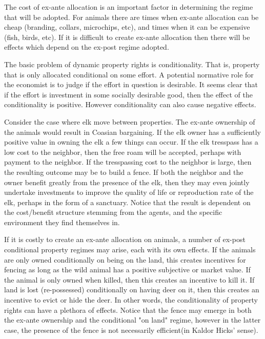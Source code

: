 \documentclass[12pt]{report}
\numberwithin{equation}{section}
\begin{document}
The cost of ex-ante allocation is an important factor in determining the regime that will be adopted. For animals there are times when ex-ante allocation can be cheap (branding, collars, microchips, etc), and times when it can be expensive (fish, birds, etc). If it is difficult to create ex-ante allocation then there will be effects which depend on the ex-post regime adopted.

The basic problem of dynamic property rights is conditionality. That is, property that is only allocated conditional on some effort. A potential normative role for the economist is to judge if the effort in question is desirable. It seems clear that if the effort is investment in some socially desirable good, then the effect of the conditionality is positive. However conditionality can also cause negative effects. 

Consider the case where elk move between properties. The ex-ante ownership of the animals would result in Coasian bargaining. If the elk owner has a sufficiently positive value in owning the elk a few things can occur. If the elk tresspass has a low cost to the neighbor, then the free roam will be accepted, perhaps with payment to the neighbor. If the tresspassing cost to the neighbor is large, then the resulting outcome may be to build a fence. If both the neighbor and the owner benefit greatly from the presence of the elk, then they may even jointly undertake investments to improve the quality of life or reproduction rate of the elk, perhaps in the form of a sanctuary. Notice that the result is dependent on the cost/benefit structure stemming from the agents, and the specific environment they find themselves in. 

If it is costly to create an ex-ante allocation on animals, a number of ex-post conditional property regimes may arise, each with its own effects. If the animals are only owned conditionally on being on the land, this creates incentives for fencing as long as the wild animal has a positive subjective or market value. If the animal is only owned when killed, then this creates an incentive to kill it. If land is lost (re-possessed) conditionally on having deer on it, then this creates an incentive to evict or hide the deer. In other words, the conditionality of property rights can have a plethora of effects. Notice that the fence may emerge in both the ex-ante ownership and the conditional "on land" regime, however in the latter case, the presence of the fence is not necessarily efficient(in Kaldor Hicks' sense). 
\end{document}
